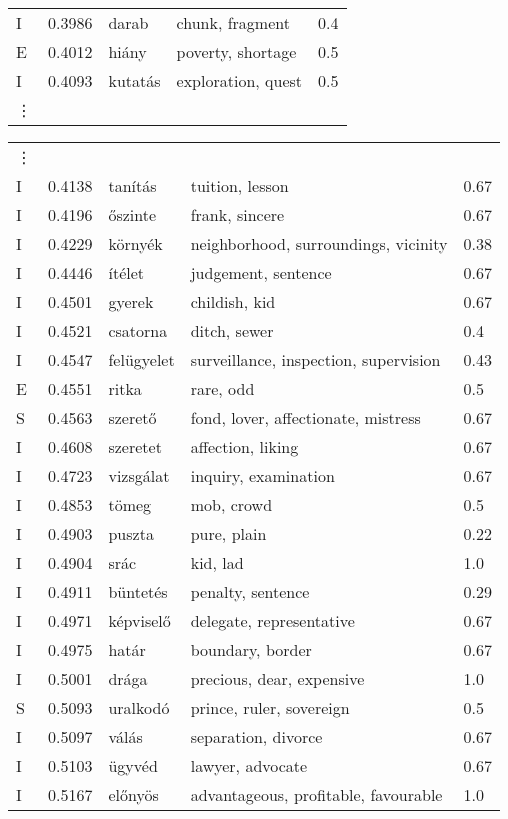 \documentclass[11pt]{article}
\begin{document}
\begin{table*}
{\begin{tabular}{lllll}
      I	& 0.3986	& darab	& chunk, fragment	& 0.4 \\
      E	& 0.4012	& hiány	& poverty, shortage	& 0.5 \\
      I	& 0.4093	& kutatás	& exploration, quest	& 0.5 \\
      \vdots
    \end{tabular} 
  \begin{tabular}{lllll}
      \vdots\\
    I	& 0.4138	& tanítás	& tuition, lesson	& 0.67 \\
    I	& 0.4196	& őszinte	& frank, sincere	& 0.67 \\
    I	& 0.4229	& környék	& neighborhood, surroundings, vicinity	& 0.38 \\
    I	& 0.4446	& ítélet	& judgement, sentence	& 0.67 \\
    I	& 0.4501	& gyerek	& childish, kid	& 0.67 \\
    I	& 0.4521	& csatorna	& ditch, sewer	& 0.4 \\
    I	& 0.4547	& felügyelet	& surveillance, inspection, supervision	& 0.43 \\
    E	& 0.4551	& ritka	& rare, odd	& 0.5 \\
    S	& 0.4563	& szerető	& fond, lover, affectionate, mistress	& 0.67 \\
    I	& 0.4608	& szeretet	& affection, liking	& 0.67 \\
    I	& 0.4723	& vizsgálat	& inquiry, examination	& 0.67 \\
    I	& 0.4853	& tömeg	& mob, crowd	& 0.5 \\
    I	& 0.4903	& puszta	& pure, plain	& 0.22 \\
    I	& 0.4904	& srác	& kid, lad	& 1.0 \\
    I	& 0.4911	& büntetés	& penalty, sentence	& 0.29 \\
    I	& 0.4971	& képviselő	& delegate, representative	& 0.67 \\
    I	& 0.4975	& határ	& boundary, border	& 0.67 \\
    I	& 0.5001	& drága	& precious, dear, expensive	& 1.0 \\
    S	& 0.5093	& uralkodó	& prince, ruler, sovereign	& 0.5 \\
    I	& 0.5097	& válás	& separation, divorce	& 0.67 \\
    I	& 0.5103	& ügyvéd	& lawyer, advocate	& 0.67 \\
    I	& 0.5167	& előnyös	& advantageous, profitable, favourable	& 1.0 \\

\end{tabular}}
\end{table*}
\end{document}
